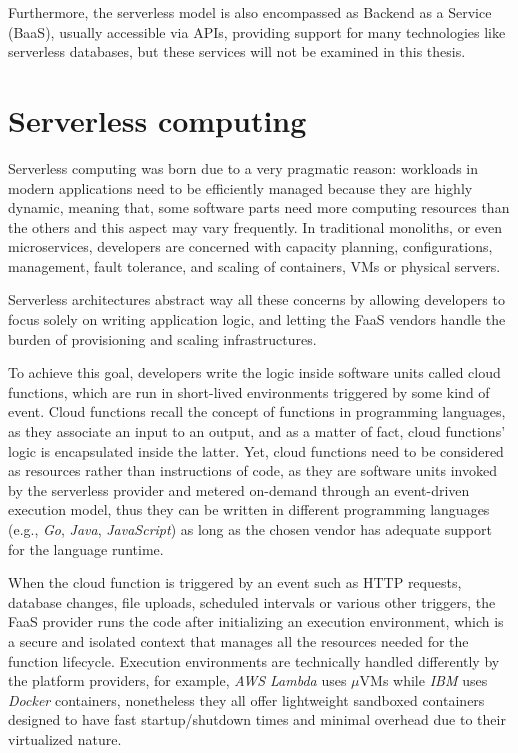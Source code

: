Furthermore, the serverless model is also encompassed as Backend as a Service (BaaS),
usually accessible via APIs, providing support for many technologies like serverless databases,
but these services will not be examined in this thesis.

\section{Serverless computing}

Serverless computing was born due to a very pragmatic reason:
workloads in modern applications need to be efficiently managed
because they are highly dynamic, meaning that, some software parts
need more computing resources than the others and this aspect may vary frequently.
In traditional monoliths, or even microservices, developers are concerned
with capacity planning, configurations, management, fault tolerance, and
scaling of containers, VMs or physical servers.

Serverless architectures abstract way all these concerns
by allowing developers to focus solely on writing application logic,
and letting the FaaS vendors handle the burden of provisioning and scaling infrastructures.

To achieve this goal, developers write the logic inside software units
called cloud functions, which are run in short-lived environments triggered by some kind of event.
Cloud functions recall the concept of functions in programming languages,
as they associate an input to an output, and as a matter of fact, 
cloud functions' logic is encapsulated inside the latter.
Yet, cloud functions need to be considered as resources rather than instructions of code,
as they are software units invoked by the serverless provider and metered on-demand through an event-driven execution model,
thus they can be written in different programming languages (e.g., \textit{Go}, \textit{Java}, \textit{JavaScript})
as long as the chosen vendor has adequate support for the language runtime.

When the cloud function is triggered by an event such as
HTTP requests, database changes, file uploads, scheduled intervals or various other triggers,
the FaaS provider runs the code
after initializing an execution environment, which is a secure and isolated context
that manages all the resources needed for the function lifecycle.
Execution environments are technically handled differently by the platform providers, for example,
\textit{AWS Lambda} uses $\mu$VMs while \textit{IBM} uses \textit{Docker} containers,
nonetheless they all offer lightweight sandboxed containers designed to
have fast startup/shutdown times and minimal overhead due to their virtualized nature.

